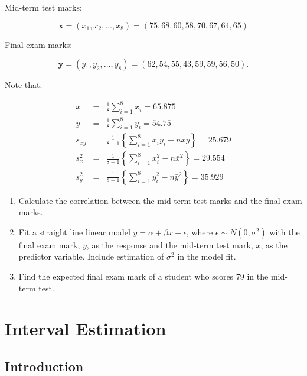 \documentclass[
]{book}
\providecommand{\tightlist}{%
  \setlength{\itemsep}{0pt}\setlength{\parskip}{0pt}}
\begin{document}
Mid-term test marks:

\[ \mathbf{x} = (x_1, x_2, \ldots, x_{8}) = ( 75, 68, 60, 58, 70, 67, 64, 65 ) \]

Final exam marks:

\[ \mathbf{y} = (y_1, y_2, \ldots, y_{8}) = ( 62, 54, 55, 43, 59, 59, 56, 50 ). \]

Note that:

\begin{eqnarray*}
\bar{x} &=& \frac{1}{8} \sum_{i=1}^{8} x_i = 65.875 \\
\bar{y} &=& \frac{1}{8} \sum_{i=1}^{8} y_i = 54.75 \\
s_{xy} &=&  \frac{1}{8 -1} \left\{\sum_{i=1}^{8} x_iy_i - n \bar{x} \bar{y} \right\} = 25.679 \\
s_x^2 &=&  \frac{1}{8 -1} \left\{\sum_{i=1}^{8} x_i^2 - n \bar{x}^2 \right\} = 29.554 \\
s_y^2 &=&  \frac{1}{8 -1} \left\{\sum_{i=1}^{8} y_i^2 - n \bar{y}^2 \right\} = 35.929
\end{eqnarray*}

\begin{enumerate}
\def\labelenumi{(\alph{enumi})}
\tightlist
\item
  Calculate the correlation between the mid-term test marks and the final exam marks.\\
\item
  Fit a straight line linear model \(y = \alpha + \beta x + \epsilon\), where \(\epsilon \sim N(0,\sigma^2)\) with the final exam mark, \(y\), as the response and the mid-term test mark, \(x\), as the predictor variable. Include estimation of \(\sigma^2\) in the model fit.\\
\item
  Find the expected final exam mark of a student who scores 79 in the mid-term test.\\
\end{enumerate}

\hypertarget{Interval_Estimation}{%
\chapter{Interval Estimation}\label{Interval_Estimation}}

\hypertarget{Interval_Estimation:intro}{%
\section{Introduction}\label{Interval_Estimation:intro}}
\end{document}
